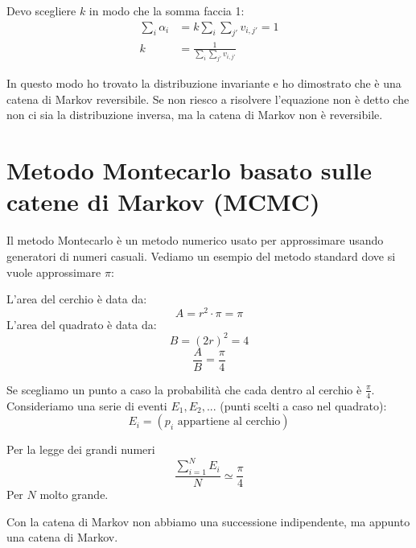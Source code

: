 \documentclass[a4paper,12pt]{book}
\newcommand\ddfrac[2]{\frac{\displaystyle #1}{\displaystyle #2}}
\begin{document}
Devo scegliere $ k $ in modo che la somma faccia 1:
\begin{align*}
	\sum_{i}\alpha_{i} & = k\sum_{i}\sum_{j'}v_{i,j'} = 1 \\
	k & = \ddfrac{1}{\sum_{i}\sum_{j'}v_{i,j'}}
\end{align*}

In questo modo ho trovato la distribuzione invariante e ho dimostrato che è una catena di Markov reversibile. Se non riesco a risolvere l'equazione non è detto che non ci sia la distribuzione inversa, ma la catena di Markov non è reversibile. 

\section{Metodo Montecarlo basato sulle catene di Markov (MCMC)}
Il metodo Montecarlo è un metodo numerico usato per approssimare usando generatori di numeri casuali. Vediamo un esempio del metodo standard dove si vuole approssimare $\pi$:
\begin{multicols}{2}
	
	L'area del cerchio è data da:
	$$ A = r^2\cdot \pi = \pi $$
	L'area del quadrato è data da:
	$$ B = (2r)^2 = 4 $$
	$$ \ddfrac{A}{B} = \frac{\pi}{4}$$
	
\end{multicols}

Se scegliamo un punto a caso la probabilità che cada dentro al cerchio è $\frac{\pi}{4}$. Consideriamo una serie di eventi $ E_1, E_2, ... $ (punti scelti a caso nel quadrato):
$$ E_i = (p_i \text{ appartiene al cerchio})$$

Per la legge dei grandi numeri
$$ \ddfrac{\sum_{i=1}^{N} E_i}{N} \simeq \ddfrac{\pi}{4} $$
Per $ N $ molto grande. 

Con la catena di Markov non abbiamo una successione indipendente, ma appunto una catena di Markov. %
\end{document}
